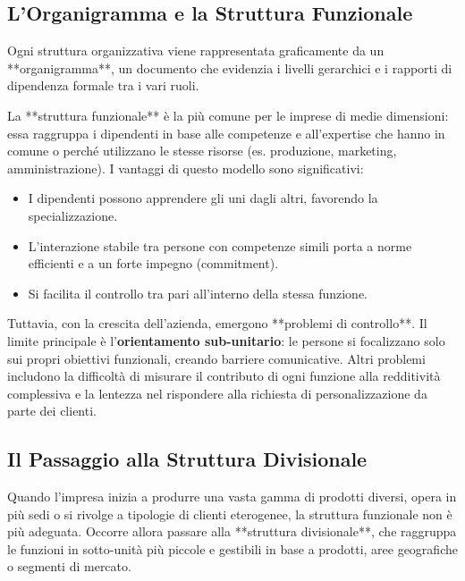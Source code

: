 \documentclass[a4paper,10pt]{article}
\begin{document}
\subsection*{L'Organigramma e la Struttura Funzionale}

Ogni struttura organizzativa viene rappresentata graficamente da un **organigramma**, un documento che evidenzia i livelli gerarchici e i rapporti di dipendenza formale tra i vari ruoli. 

La **struttura funzionale** è la più comune per le imprese di medie dimensioni: essa raggruppa i dipendenti in base alle competenze e all’expertise che hanno in comune o perché utilizzano le stesse risorse (es. produzione, marketing, amministrazione).
I vantaggi di questo modello sono significativi:
\begin{itemize}
    \item I dipendenti possono apprendere gli uni dagli altri, favorendo la specializzazione.
    \item L'interazione stabile tra persone con competenze simili porta a norme efficienti e a un forte impegno (commitment).
    \item Si facilita il controllo tra pari all'interno della stessa funzione.
\end{itemize}

Tuttavia, con la crescita dell'azienda, emergono **problemi di controllo**. Il limite principale è l'\textbf{orientamento sub-unitario}: le persone si focalizzano solo sui propri obiettivi funzionali, creando barriere comunicative. Altri problemi includono la difficoltà di misurare il contributo di ogni funzione alla redditività complessiva e la lentezza nel rispondere alla richiesta di personalizzazione da parte dei clienti.

\subsection*{Il Passaggio alla Struttura Divisionale}

Quando l'impresa inizia a produrre una vasta gamma di prodotti diversi, opera in più sedi o si rivolge a tipologie di clienti eterogenee, la struttura funzionale non è più adeguata. Occorre allora passare alla **struttura divisionale**, che raggruppa le funzioni in sotto-unità più piccole e gestibili in base a prodotti, aree geografiche o segmenti di mercato.
\end{document}
